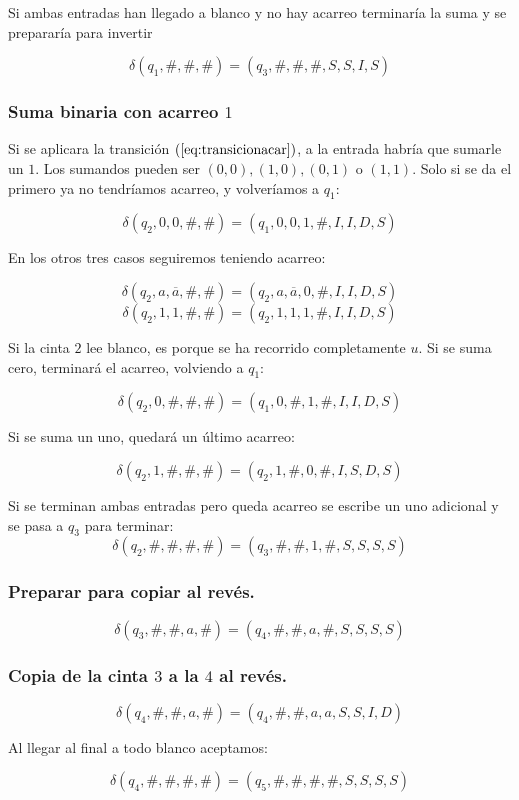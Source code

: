 \documentclass[12pt]{article}
\begin{document}
\begin{ejercicio}
        Si ambas entradas han llegado a blanco y no hay acarreo terminaría
        la suma y se prepararía para invertir

        $$\delta(q_1, \#, \#, \#) = (q_3, \#, \#, \#, S, S, I, S)$$

        \newpage

        \subsubsection*{Suma binaria con acarreo $1$}

        Si se aplicara la transición $(\ref{eq:transicionacar})$, 
        a la entrada habría que sumarle un $1$. Los sumandos pueden ser 
        $(0,0), (1,0), (0,1)$ o $(1,1)$. Solo si se da el primero ya no tendríamos 
        acarreo, y volveríamos a $q_1$:

        $$\delta(q_2, 0, 0, \#, \#) = (q_1, 0, 0, 1, \#, I, I, D, S)$$
        
        En los otros tres casos seguiremos teniendo acarreo:
        
        $$\delta(q_2, a, \overline{a}, \#, \#) = (q_2, a, \overline{a}, 0, \#, I, I, D, S)$$
        $$\delta(q_2, 1, 1, \#, \#) = (q_2, 1, 1, 1, \#, I, I, D, S)$$

        Si la cinta $2$ lee blanco, es porque se ha recorrido completamente $u$.
        Si se suma cero, terminará el acarreo, volviendo a $q_1$:

        $$\delta(q_2, 0, \#, \#, \#) = (q_1, 0, \#, 1, \#, I, I, D, S)$$

        Si se suma un uno, quedará un último acarreo:

        $$\delta(q_2, 1, \#, \#, \#) = (q_2, 1, \#, 0, \#, I, S, D, S)$$

        Si se terminan ambas entradas pero queda acarreo se escribe
        un uno adicional y se pasa a $q_3$ para terminar:
        $$\delta(q_2, \#, \#, \#, \#) = (q_3, \#, \#, 1, \#, S, S, S, S)$$

        \subsubsection*{Preparar para copiar al revés.}

        $$\delta(q_3, \#, \#, a, \#) = (q_4, \#, \#, a, \#, S, S, S, S)$$

        \subsubsection*{Copia de la cinta $3$ a la $4$ al revés.}

        $$\delta(q_4, \#, \#, a, \#) = (q_4, \#, \#, a, a, S, S, I, D)$$

        Al llegar al final a todo blanco aceptamos:

        $$\delta(q_4, \#, \#, \#, \#) = (q_5, \#, \#, \#, \#, S, S, S, S)$$
    \end{ejercicio}
\end{document}

